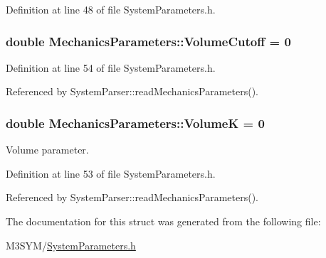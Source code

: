 Definition at line 48 of file System\+Parameters.\+h.

\hypertarget{structMechanicsParameters_a597ef187ef21d3eca159e00264bf425c}{
\subsubsection[{Volume\+Cutoff}]{\setlength{\rightskip}{0pt plus 5cm}double Mechanics\+Parameters\+::\+Volume\+Cutoff = 0}}\label{structMechanicsParameters_a597ef187ef21d3eca159e00264bf425c}


Definition at line 54 of file System\+Parameters.\+h.



Referenced by System\+Parser\+::read\+Mechanics\+Parameters().

\hypertarget{structMechanicsParameters_a49a5ad4e84d9c8acafc8bd38018245d1}{
\subsubsection[{Volume\+K}]{\setlength{\rightskip}{0pt plus 5cm}double Mechanics\+Parameters\+::\+Volume\+K = 0}}\label{structMechanicsParameters_a49a5ad4e84d9c8acafc8bd38018245d1}


Volume parameter. 



Definition at line 53 of file System\+Parameters.\+h.



Referenced by System\+Parser\+::read\+Mechanics\+Parameters().



The documentation for this struct was generated from the following file\+:\begin{DoxyCompactItemize}
\item 
M3\+S\+Y\+M/\hyperlink{SystemParameters_8h}{System\+Parameters.\+h}\end{DoxyCompactItemize}
